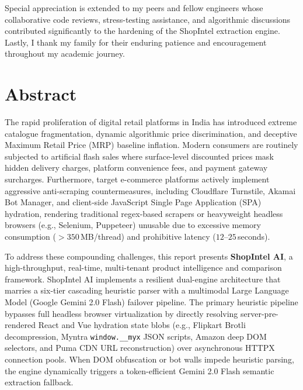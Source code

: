 \documentclass[12pt,a4paper,oneside]{report}
\begin{document}
Special appreciation is extended to my peers and fellow engineers whose collaborative code reviews, stress-testing assistance, and algorithmic discussions contributed significantly to the hardening of the ShopIntel extraction engine. Lastly, I thank my family for their enduring patience and encouragement throughout my academic journey.

\newpage

\chapter*{Abstract}

The rapid proliferation of digital retail platforms in India has introduced extreme catalogue fragmentation, dynamic algorithmic price discrimination, and deceptive Maximum Retail Price (MRP) baseline inflation. Modern consumers are routinely subjected to artificial flash sales where surface-level discounted prices mask hidden delivery charges, platform convenience fees, and payment gateway surcharges. Furthermore, target e-commerce platforms actively implement aggressive anti-scraping countermeasures, including Cloudflare Turnstile, Akamai Bot Manager, and client-side JavaScript Single Page Application (SPA) hydration, rendering traditional regex-based scrapers or heavyweight headless browsers (e.g., Selenium, Puppeteer) unusable due to excessive memory consumption ($>350$\,MB/thread) and prohibitive latency ($12$--$25$\,seconds).

To address these compounding challenges, this report presents \textbf{ShopIntel AI}, a high-throughput, real-time, multi-tenant product intelligence and comparison framework. ShopIntel AI implements a resilient dual-engine architecture that marries a six-tier cascading heuristic parser with a multimodal Large Language Model (Google Gemini 2.0 Flash) failover pipeline. The primary heuristic pipeline bypasses full headless browser virtualization by directly resolving server-pre-rendered React and Vue hydration state blobs (e.g., Flipkart Brotli decompression, Myntra \texttt{window.\_\_myx} JSON scripts, Amazon deep DOM selectors, and Puma CDN URL reconstruction) over asynchronous HTTPX connection pools. When DOM obfuscation or bot walls impede heuristic parsing, the engine dynamically triggers a token-efficient Gemini 2.0 Flash semantic extraction fallback.
\end{document}
